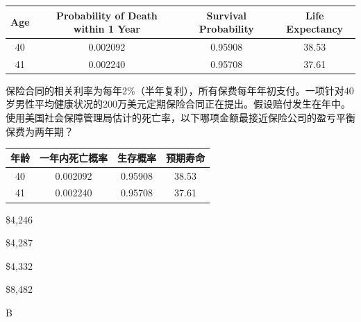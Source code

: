 \documentclass{article}
\begin{document}
\begin{table}[H]
\centering
\begin{tabular}{|c|c|c|c|}
\hline
\textbf{Age} & \textbf{Probability of Death within 1 Year} & \textbf{Survival Probability} & \textbf{Life Expectancy} \\ \hline
40 & 0.002092 & 0.95908 & 38.53 \\ \hline
41 & 0.002240 & 0.95708 & 37.61 \\ \hline
\end{tabular}
\end{table}

    保险合同的相关利率为每年2\%（半年复利），所有保费每年年初支付。一项针对40岁男性平均健康状况的200万美元定期保险合同正在提出。假设赔付发生在年中。使用美国社会保障管理局估计的死亡率，以下哪项金额最接近保险公司的盈亏平衡保费为两年期？
    \begin{table}[H]
        \centering
        \begin{tabular}{|c|c|c|c|}
        \hline
        \textbf{年龄} & \textbf{一年内死亡概率} & \textbf{生存概率} & \textbf{预期寿命} \\ \hline
        40 & 0.002092 & 0.95908 & 38.53 \\ \hline
        41 & 0.002240 & 0.95708 & 37.61 \\ \hline
        \end{tabular}
        \end{table}

\begin{choices}
    \item \$4,246
    \item \$4,287
    \item \$4,332
    \item \$8,482
\end{choices}

\begin{correctanswer}
   B
\end{correctanswer}
\end{document}
